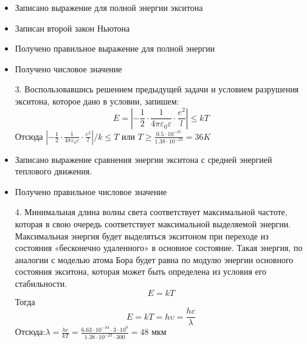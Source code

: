 \markSection

\begin{itemize}
\item Записано выражение для полной энергии экситона 
\item Записан второй закон Ньютона
\item Получено правильное выражение для полной энергии
\item Получено числовое значение
\end{itemize}
\begin{enumerate}
\item[3.] Воспользовавшись решением предыдущей задачи и условием разрушения экситона, которое дано в условии, запишем:
$$E=\left|-\frac{1}{2}\cdot\frac{1}{4\pi\varepsilon_0\varepsilon}\cdot\frac{e^2}{l}\right|\leqslant kT$$
Отсюда $\left|-\frac{1}{2}\cdot\frac{1}{4\pi\varepsilon_0\varepsilon}\cdot\frac{e^2}{l}\right|/k\leqslant T$ или $T \geqslant\frac{0.5\cdot10^{-21}}{1.38\cdot10^{-23}}=36K$\\
\end{enumerate}

\markSection
\begin{itemize}
\item Записано выражение сравнения энергии экситона с средней энергией теплового движения.
\item Получено правильное числовое значение
\end{itemize}
\begin{enumerate}
\item[4.] Минимальная длина волны света соответствует максимальной частоте, которая в свою очередь соответствует максимальной выделяемой энергии. Максимальная энергия будет выделяться экситоном при переходе из состояния «бесконечно удаленного» в основное состояние. Такая энергия, по аналогии с моделью атома Бора будет равна по модулю энергии основного состояния экситона, которая может быть определена из условия его стабильности.\\
$$E=kT$$
Тогда 
$$E=kT=h\upsilon=\frac{hc}{\lambda}$$
Отсюда:$\lambda=\frac{hc}{kT}=\frac{6.63\cdot10^{-34}\cdot3\cdot10^8}{1.38\cdot10^{-23}\cdot300}=48$ мкм\\
\end{enumerate}

\markSection

